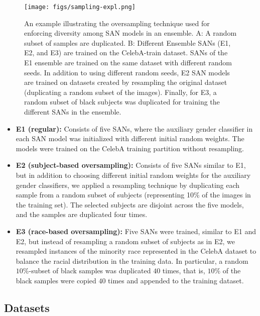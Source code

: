 \documentclass[10pt,twocolumn,letterpaper]{article}
\begin{document}
\begin{figure}
\begin{center}
   \texttt{[image: figs/sampling-expl.png]}
\end{center}
   \caption{An example illustrating the oversampling technique used for enforcing diversity among SAN models in an ensemble. A: A random subset of samples are duplicated. B: Different Ensemble SANs (E1, E2, and E3) are trained on the CelebA-train dataset. SANs of the E1 ensemble are trained on the same dataset with different random seeds. In addition to using different random seeds, E2 SAN models are trained on datasets created by resampling the original dataset (duplicating a random subset of the images). Finally, for E3, a random subset of black subjects was duplicated for training the different SANs in the ensemble.}
\label{fig:example-oversampling}
\end{figure}

\begin{itemize}[noitemsep]
\item {\bf E1 (regular):} Consists of five SANs, where the auxiliary gender classifier in each SAN model was initialized with different initial random weights. The models were trained on the CelebA training partition without resampling.
\item {\bf E2 (subject-based oversampling):} Consists of five  SANs similar to E1, but in addition to choosing different initial random weights for the auxiliary gender classifiers, we applied a resampling technique by  duplicating each sample from a random subset of subjects (representing 10\% of the images in the training set).
The selected subjects are disjoint across the five models, and the samples are duplicated four times.
\item {\bf E3 (race-based oversampling):} Five SANs were trained, similar to E1 and E2, but instead of resampling a random subset of subjects as in E2, we resampled instances of the minority race represented in the CelebA dataset to balance the racial distribution in the training data. In particular, a random $10\%$-subset of black samples was duplicated $40$ times, that is, $10\%$ of the black samples were copied $40$ times and appended to the training dataset.
\end{itemize}



\subsection{Datasets}
\end{document}

